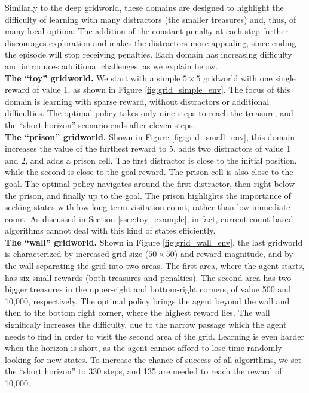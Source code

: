 \documentclass{article}
\begin{document}
Similarly to the deep gridworld, these domains are designed to highlight the difficulty of learning with many distractors (the smaller treasures) and, thus, of many local optima. The addition of the constant penalty at each step further discourages exploration and makes the distractors more appealing, since ending the episode will stop receiving penalties. Each domain has increasing difficulty and introduces additional challenges, as we explain below. 
\\[5pt]
\textbf{The ``toy'' gridworld.} We start with a simple $5\times5$ gridworld with one single reward of value 1, as shown in Figure \ref{fig:grid_simple_env}. The focus of this domain is learning with sparse reward, without distractors or additional difficulties. The optimal policy takes only nine steps to reach the treasure, and the ``short horizon'' scenario ends after eleven steps.
\\[5pt]
\textbf{The ``prison'' gridworld.} Shown in Figure \ref{fig:grid_small_env}, this domain increases the value of the furthest reward to 5, adds two distractors of value 1 and 2, and adds a prison cell. The first distractor is close to the initial position, while the second is close to the goal reward. The prison cell is also close to the goal. The optimal policy navigates around the first distractor, then right below the prison, and finally up to the goal. The prison 
highlights the importance of seeking states with low long-term visitation count, rather than low immediate count. As discussed in Section \ref{ssec:toy_example}, in fact, current count-based algorithms cannot deal with this kind of states efficiently.
\\[5pt]
\textbf{The ``wall'' gridworld.} Shown in Figure \ref{fig:grid_wall_env}, the last gridworld is characterized by increased grid size ($50\times50$) and reward magnitude, and by the wall separating the grid into two areas. 
The first area, where the agent starts, has six small rewards (both treasures and penalties). The second area has two bigger treasures in the upper-right and bottom-right corners, of value 500 and 10,000, respectively. The optimal policy brings the agent beyond the wall and then to the bottom right corner, where the highest reward lies. The wall significaly increases the difficulty, due to the narrow passage which the agent needs to find in order to visit the second area of the grid. Learning is even harder when the horizon is short, as the agent cannot afford to lose time randomly looking for new states. To increase the chance of success of all algorithms, we set the ``short horizon'' to 330 steps, and 135 are needed to reach the reward of 10,000. 
\end{document}

